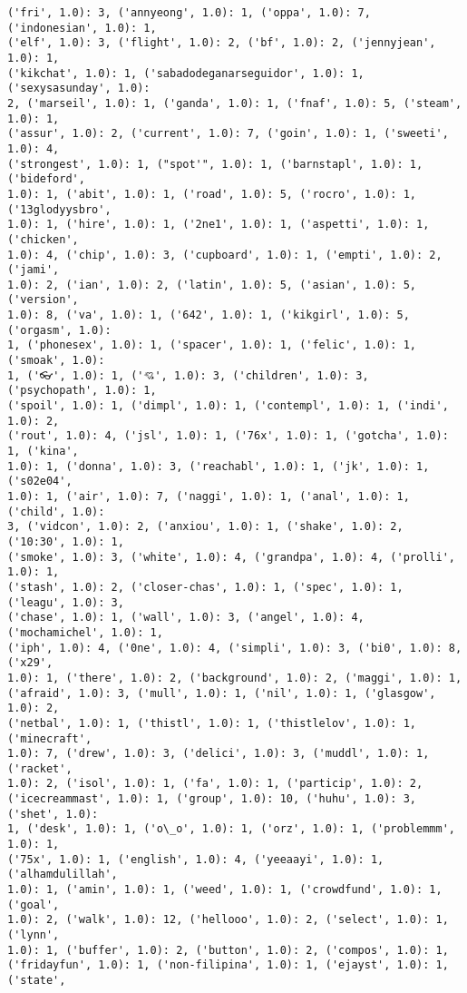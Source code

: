 \documentclass[11pt]{article}
\begin{document}
\begin{Verbatim}[commandchars=\\\{\}]
('fri', 1.0): 3, ('annyeong', 1.0): 1, ('oppa', 1.0): 7, ('indonesian', 1.0): 1,
('elf', 1.0): 3, ('flight', 1.0): 2, ('bf', 1.0): 2, ('jennyjean', 1.0): 1,
('kikchat', 1.0): 1, ('sabadodeganarseguidor', 1.0): 1, ('sexysasunday', 1.0):
2, ('marseil', 1.0): 1, ('ganda', 1.0): 1, ('fnaf', 1.0): 5, ('steam', 1.0): 1,
('assur', 1.0): 2, ('current', 1.0): 7, ('goin', 1.0): 1, ('sweeti', 1.0): 4,
('strongest', 1.0): 1, ("spot'", 1.0): 1, ('barnstapl', 1.0): 1, ('bideford',
1.0): 1, ('abit', 1.0): 1, ('road', 1.0): 5, ('rocro', 1.0): 1, ('13glodyysbro',
1.0): 1, ('hire', 1.0): 1, ('2ne1', 1.0): 1, ('aspetti', 1.0): 1, ('chicken',
1.0): 4, ('chip', 1.0): 3, ('cupboard', 1.0): 1, ('empti', 1.0): 2, ('jami',
1.0): 2, ('ian', 1.0): 2, ('latin', 1.0): 5, ('asian', 1.0): 5, ('version',
1.0): 8, ('va', 1.0): 1, ('642', 1.0): 1, ('kikgirl', 1.0): 5, ('orgasm', 1.0):
1, ('phonesex', 1.0): 1, ('spacer', 1.0): 1, ('felic', 1.0): 1, ('smoak', 1.0):
1, ('👓', 1.0): 1, ('💘', 1.0): 3, ('children', 1.0): 3, ('psychopath', 1.0): 1,
('spoil', 1.0): 1, ('dimpl', 1.0): 1, ('contempl', 1.0): 1, ('indi', 1.0): 2,
('rout', 1.0): 4, ('jsl', 1.0): 1, ('76x', 1.0): 1, ('gotcha', 1.0): 1, ('kina',
1.0): 1, ('donna', 1.0): 3, ('reachabl', 1.0): 1, ('jk', 1.0): 1, ('s02e04',
1.0): 1, ('air', 1.0): 7, ('naggi', 1.0): 1, ('anal', 1.0): 1, ('child', 1.0):
3, ('vidcon', 1.0): 2, ('anxiou', 1.0): 1, ('shake', 1.0): 2, ('10:30', 1.0): 1,
('smoke', 1.0): 3, ('white', 1.0): 4, ('grandpa', 1.0): 4, ('prolli', 1.0): 1,
('stash', 1.0): 2, ('closer-chas', 1.0): 1, ('spec', 1.0): 1, ('leagu', 1.0): 3,
('chase', 1.0): 1, ('wall', 1.0): 3, ('angel', 1.0): 4, ('mochamichel', 1.0): 1,
('iph', 1.0): 4, ('0ne', 1.0): 4, ('simpli', 1.0): 3, ('bi0', 1.0): 8, ('x29',
1.0): 1, ('there', 1.0): 2, ('background', 1.0): 2, ('maggi', 1.0): 1,
('afraid', 1.0): 3, ('mull', 1.0): 1, ('nil', 1.0): 1, ('glasgow', 1.0): 2,
('netbal', 1.0): 1, ('thistl', 1.0): 1, ('thistlelov', 1.0): 1, ('minecraft',
1.0): 7, ('drew', 1.0): 3, ('delici', 1.0): 3, ('muddl', 1.0): 1, ('racket',
1.0): 2, ('isol', 1.0): 1, ('fa', 1.0): 1, ('particip', 1.0): 2,
('icecreammast', 1.0): 1, ('group', 1.0): 10, ('huhu', 1.0): 3, ('shet', 1.0):
1, ('desk', 1.0): 1, ('o\_o', 1.0): 1, ('orz', 1.0): 1, ('problemmm', 1.0): 1,
('75x', 1.0): 1, ('english', 1.0): 4, ('yeeaayi', 1.0): 1, ('alhamdulillah',
1.0): 1, ('amin', 1.0): 1, ('weed', 1.0): 1, ('crowdfund', 1.0): 1, ('goal',
1.0): 2, ('walk', 1.0): 12, ('hellooo', 1.0): 2, ('select', 1.0): 1, ('lynn',
1.0): 1, ('buffer', 1.0): 2, ('button', 1.0): 2, ('compos', 1.0): 1,
('fridayfun', 1.0): 1, ('non-filipina', 1.0): 1, ('ejayst', 1.0): 1, ('state',

\end{Verbatim}
\end{document}
